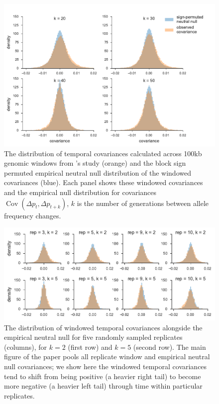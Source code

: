 \documentclass[11pt]{article}
\DeclareMathOperator{\cov}{Cov}
\begin{document}
\begin{figure}[!ht]
  \centering
  \includegraphics[]{figures/barghi-offset-panels.pdf}

  \caption{The distribution of temporal covariances calculated across 100kb
    genomic windows from \textcite{Barghi2019-qy}'s study (orange) and the
    block sign permuted empirical neutral null distribution of the windowed
    covariances (blue). Each panel shows these windowed covariances and the
    empirical null distribution for covariances $\cov(\Delta p_t, \Delta p_{t+k})$,
  $k$ is the number of generations between allele frequency changes.}
  \label{suppfig:barghi-empnull-tilecovs}
\end{figure}


\begin{figure}[!ht]
  \centering
  \includegraphics[]{figures/barghi-offset-replicate-panels.pdf}

  \caption{The distribution of windowed temporal covariances alongside the
    empirical neutral null for five randomly sampled replicates (columns), for
    $k=2$ (first row) and $k=5$ (second row). The main figure of the paper
    pools all replicate window and empirical neutral null covariances; we show
    here the windowed temporal covariances tend to shift from being positive (a
    heavier right tail) to become more negative (a heavier left tail) through
    time within particular replicates.}
  
  \label{suppfig:barghi-offset-replicate-panels}
\end{figure}
\end{document}
